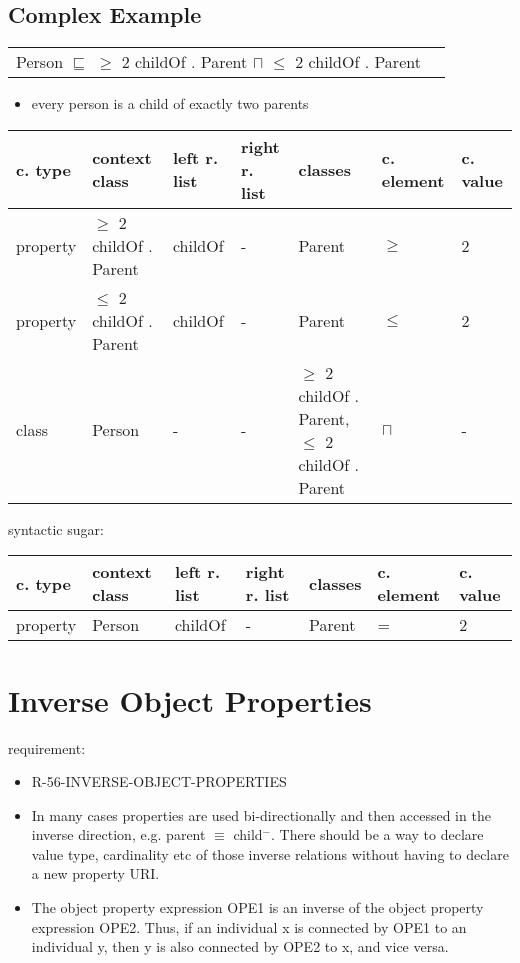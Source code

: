 \documentclass{llncs}
\newenvironment{gcotable}{
  \scriptsize
  \sffamily
  \vspace{0.3cm}
	\begin{center}
  \begin{tabular}{l|l|l|l|l|l|l}
  \hline
  \textbf{c. type} & \textbf{context class} & \textbf{left r. list} & \textbf{right r. list} & \textbf{classes} & \textbf{c. element} & \textbf{c. value} \\
  \hline

}{
  \hline
  \end{tabular}
	\end{center}
}
\newenvironment{DL}{
	\begin{center}
  \begin{tabular}{r l}

}{
  \end{tabular}
	\end{center}
}
\newcommand{\tb}[1]{\todo[size=\small, color=blue!40]{\textbf{Thomas:} #1}}
\begin{document}
\subsection{Complex Example}

\begin{DL}
Person $\sqsubseteq$ $\geq$ 2 childOf . Parent $\sqcap$ $\leq$  2 childOf . Parent \\
\end{DL}


\begin{itemize}
	\item every person is a child of exactly two parents
\end{itemize}

\begin{gcotable}
property & $\geq$ 2 childOf . Parent & childOf & - & Parent & $\geq$ & 2 \\
property & $\leq$ 2 childOf . Parent & childOf & - & Parent & $\leq$ & 2 \\
class & Person & - & - & $\geq$ 2 childOf . Parent, $\leq$ 2 childOf . Parent & $\sqcap$ & - \\
\end{gcotable}

syntactic sugar:

\begin{gcotable}
property & Person & childOf & - & Parent & = & 2 \\
\end{gcotable}

\section{Inverse Object Properties}

requirement:

\begin{itemize}
	\item R-56-INVERSE-OBJECT-PROPERTIES
\end{itemize}



\begin{itemize}
	\item In many cases properties are used bi-directionally and then accessed in the inverse direction, e.g. parent $\equiv$ child$^{-}$. There should be a way to declare value type, cardinality etc of those inverse relations without having to declare a new property URI. 
	\item The object property expression OPE1 is an inverse of the object property expression OPE2. Thus, if an individual x is connected by OPE1 to an individual y, then y is also connected by OPE2 to x, and vice versa.
\end{itemize}
\end{document}
